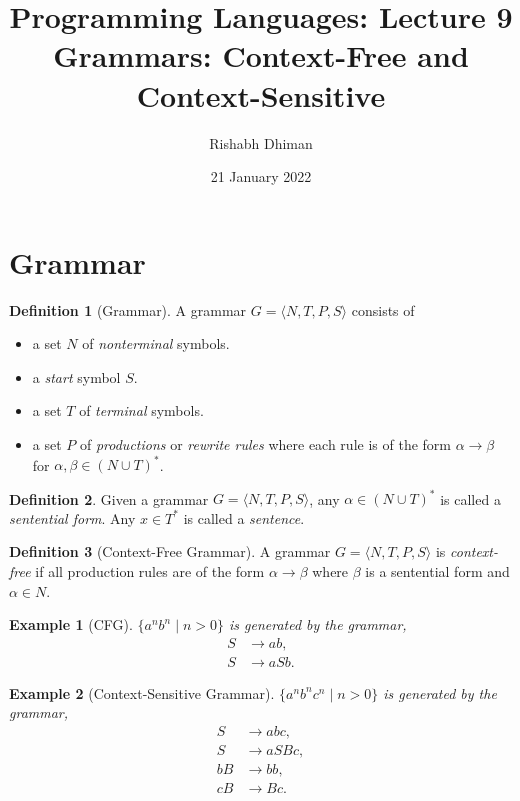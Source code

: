 \documentclass[a4paper]{scrartcl}
\title{
	Programming Languages: Lecture 9\\
	Grammars: Context-Free and Context-Sensitive
}
\author{Rishabh Dhiman}
\date{21 January 2022}
\newtheorem*{example}{Example}
\theoremstyle{definition}
\newtheorem{definition}{Definition}
\begin{document}
\maketitle

\section{Grammar}
\begin{definition}[Grammar]
A grammar $G = \langle N, T, P, S\rangle$ consists of
\begin{itemize}
	\item a set $N$ of \emph{nonterminal} symbols.
	\item a \emph{start} symbol $S$.
	\item a set $T$ of \emph{terminal} symbols.
	\item a set $P$ of \emph{productions} or \emph{rewrite rules} where each rule is of the form $\alpha \to \beta$ for $\alpha, \beta \in (N \cup T)^*$.
\end{itemize}
\end{definition}

\begin{definition}
	Given a grammar $G = \langle N, T, P, S\rangle$, any $\alpha \in (N \cup T)^*$ is called a \emph{sentential form}. Any $x \in T^*$ is called a \emph{sentence}.
\end{definition}

\begin{definition}[Context-Free Grammar]
	A grammar $G = \langle N, T, P, S\rangle$ is \emph{context-free} if all production rules are of the form $\alpha \to \beta$ where $\beta$ is a sentential form and $\alpha \in N$.
\end{definition}

\begin{example}[CFG] $\{a^n b^n \mid n > 0\}$ is generated by the grammar,
	\begin{align*}
		S &\to ab,\\
		S &\to aSb.
	\end{align*}
\end{example}

\begin{example}[Context-Sensitive Grammar] $\{a^n b^n c^n \mid n > 0\}$ is generated by the grammar,
	\begin{align*}
		S &\to abc,\\
		S &\to aSBc,\\
		bB &\to bb,\\
		cB &\to Bc.
	\end{align*}
\end{example}
\end{document}
